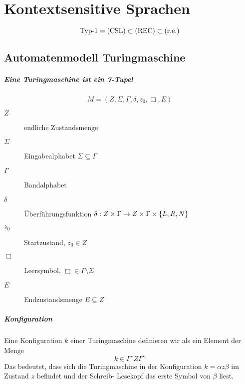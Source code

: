 \chapter{Kontextsensitive Sprachen}\label{sec:typ1}
\begin{equation*}
	\text{Typ-1} = \mathrm{(CSL)}\subset\mathrm{(REC)}\subset\mathrm{(r.e.)}
\end{equation*}

\section{Automatenmodell Turingmaschine}
\paragraph{Eine Turingmaschine ist ein 7-Tupel}
\begin{equation*}
	M=(Z,\Sigma,\Gamma,\delta,z_0,\Box,E)
\end{equation*}
\begin{description}
	\item[$Z$] endliche Zustandsmenge
	\item[$\Sigma$] Eingabealphabet $\Sigma\subseteq\Gamma$
	\item[$\Gamma$] Bandalphabet
	\item[$\delta$] Überführungsfunktion $\delta: Z\times\Gamma\rightarrow Z\times\Gamma\times\left\{ L,R,N \right\}$
	\item[$z_0$] Startzustand, $z_0\in Z$
	\item[$\Box$] Leersymbol, $\Box\in\Gamma\setminus\Sigma$
	\item[$E$] Endzustandsmenge $E\subseteq Z$
\end{description}

\paragraph{Konfiguration}
Eine Konfiguration $k$ einer Turingmaschine definieren wir als ein Element der Menge
\begin{equation*}
	k\in\Gamma^\star Z\Gamma^\star
\end{equation*}
Das bedeutet, dass sich die Turingmaschine in der Konfiguration $k=\alpha z\beta$ im Zustand $z$ befindet und der Schreib- Lesekopf das erste Symbol von $\beta$ liest.


